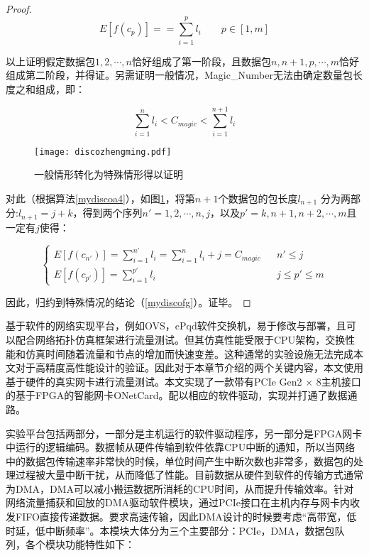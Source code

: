 \begin{proof}
	\begin{equation} \label{mydiscofg}
	E[f(c_p)]==\sum_{i=1}^{p}l_i\quad\quad p \in [1,m]
	\end{equation}
	
	以上证明假定数据包$ 1,2,\cdots,n $恰好组成了第一阶段，且数据包$ n,n+1,p,\cdots,m $恰好组成第二阶段，并得证。另需证明一般情况，Magic\_Number无法由确定数量包长度之和组成，即：
	
	\begin{equation} \label{mydiscofi}
	\sum_{i=1}^{n}l_i < C_{magic} < \sum_{i=1}^{n+1}l_i
	\end{equation}
	
	\begin{figure}[!ht]
		\centering
		\texttt{[image: discozhengming.pdf]}
		\caption{一般情形转化为特殊情形得以证明} \label{fig:discozhengming}
	\end{figure}
	
	对此（根据算法\ref{mydiscoa4}），如图\ref{fig:discozhengming}，将第$ n+1 $个数据包的包长度$ l_{n+1} $ 分为两部分:$ l_{n+1}=j+k $，得到两个序列$ n'=1,2,\cdots,n,j $，以及$ p'=k,n+1,n+2,\cdots,m $且一定有$ j $使得：
	
	\begin{equation} \label{mydiscofk}
	\left\{
	\begin{array}{rcl}
	E[f(c_{n'})]=\sum_{i=1}^{n'}l_i=\sum_{i=1}^{n}l_i+j=C_{magic}         &      & {n' \leq j} \\
	E[f(c_{p'})] =\sum_{i=1}^{p'} l_i     &      & {j\leq p' \leq m}
	\end{array} \right. 
	\end{equation}
	
	因此，归约到特殊情况的结论（\ref{mydiscofg}）。证毕。
\end{proof}


基于软件的网络实现平台，例如OVS，cPqd软件交换机，易于修改与部署，且可以配合网络拓扑仿真框架进行流量测试。但其仿真性能受限于CPU架构，交换性能和仿真时间随着流量和节点的增加而快速变差。这种通常的实验设施无法完成本文对于高精度高性能设计的验证。因此对于本章节介绍的两个关键内容，本文使用基于硬件的真实网卡进行流量测试。本文实现了一款带有PCIe Gen2 $ \times $ 8主机接口的基于FPGA的智能网卡ONetCard。配以相应的软件驱动，实现并打通了数据通路。


实验平台包括两部分，一部分是主机运行的软件驱动程序，另一部分是FPGA网卡中运行的逻辑编码。数据帧从硬件传输到软件依靠CPU中断的通知，所以当网络中的数据包传输速率非常快的时候，单位时间产生中断次数也非常多，数据包的处理过程被大量中断干扰，从而降低了性能。目前数据从硬件到软件的传输方式通常为DMA，DMA可以减小搬运数据所消耗的CPU时间，从而提升传输效率。针对网络流量捕获和回放的DMA驱动软件模块，通过PCIe接口在主机内存与网卡内收发FIFO直接传递数据。要求高速传输，因此DMA设计的时候要考虑“高带宽，低时延，低中断频率”。本模块大体分为三个主要部分：PCIe，DMA，数据包队列，各个模块功能特性如下：

